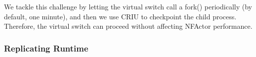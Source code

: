 We tackle this challenge by letting the virtual switch call a 
fork() periodically (by default, one minute), and then we use CRIU to checkpoint 
the child process. Therefore, the virtual switch can proceed without affecting 
NFActor performance.


\subsubsection{Replicating Runtime}

